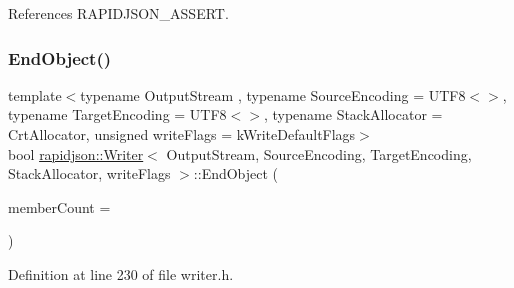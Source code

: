 References R\+A\+P\+I\+D\+J\+S\+O\+N\+\_\+\+A\+S\+S\+E\+RT.

\mbox{\label{classrapidjson_1_1_writer_ac8851882467c9c00cd8c2a202261e2b0}} 
\subsubsection{\texorpdfstring{EndObject()}{EndObject()}}
{\footnotesize\ttfamily template$<$typename Output\+Stream , typename Source\+Encoding  = U\+T\+F8$<$$>$, typename Target\+Encoding  = U\+T\+F8$<$$>$, typename Stack\+Allocator  = Crt\+Allocator, unsigned write\+Flags = k\+Write\+Default\+Flags$>$ \\
bool \mbox{\hyperlink{classrapidjson_1_1_writer}{rapidjson\+::\+Writer}}$<$ Output\+Stream, Source\+Encoding, Target\+Encoding, Stack\+Allocator, write\+Flags $>$\+::End\+Object (\begin{DoxyParamCaption}\item[{\mbox{\hyperlink{namespacerapidjson_a44eb33eaa523e36d466b1ced64b85c84}{Size\+Type}}}]{member\+Count = {} }\end{DoxyParamCaption})}



Definition at line 230 of file writer.\+h.


